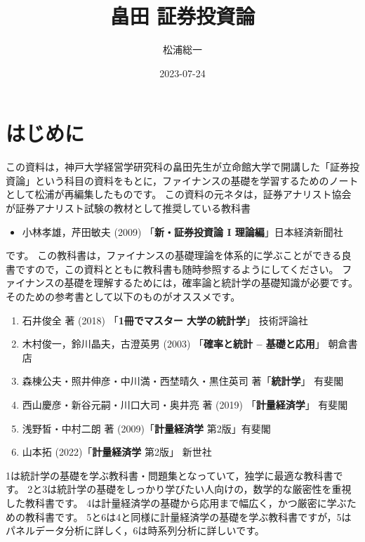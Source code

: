 \documentclass[
  letterpaper,
  pandoc,
  ja=standard,
  jafont = hiragino-pron]{ltjsbook}
\title{畠田 証券投資論}
\author{松浦総一}
\date{2023-07-24}
\providecommand{\tightlist}{%
  \setlength{\itemsep}{0pt}\setlength{\parskip}{0pt}}\usepackage{longtable,booktabs,array}
\renewcommand*\contentsname{Table of contents}
\newcommand\contentsname{Table of contents}
\begin{document}
\maketitle

\renewcommand*\contentsname{Table of contents}
{
\hypersetup{linkcolor=}
\setcounter{tocdepth}{1}
\tableofcontents
}


\chapter{はじめに}\label{ux306fux3058ux3081ux306b}

この資料は，神戸大学経営学研究科の畠田先生が立命館大学で開講した「証券投資論」という科目の資料をもとに，ファイナンスの基礎を学習するためのノートとして松浦が再編集したものです。
この資料の元ネタは，{証券アナリスト協会が証券アナリスト試験の教材として推奨している教科書}

\begin{itemize}
\tightlist
\item
  小林孝雄，芹田敏夫 (2009) 「\textbf{新・証券投資論 I
  理論編}」日本経済新聞社
\end{itemize}

です。
この教科書は，ファイナンスの基礎理論を体系的に学ぶことができる良書ですので，この資料とともに教科書も随時参照するようにしてください。
ファイナンスの基礎を理解するためには，確率論と統計学の基礎知識が必要です。そのための参考書として以下のものがオススメです。

\begin{enumerate}
\def\labelenumi{\arabic{enumi}.}
\tightlist
\item
  石井俊全 著 (2018) 「\textbf{1冊でマスター 大学の統計学}」 技術評論社
\item
  木村俊一，鈴川晶夫，古澄英男 (2003) 「\textbf{確率と統計 --
  基礎と応用}」 朝倉書店
\item
  森棟公夫・照井伸彦・中川満・西埜晴久・黒住英司 著「\textbf{統計学}」
  有斐閣
\item
  西山慶彦・新谷元嗣・川口大司・奥井亮 著 (2019) 「\textbf{計量経済学}」
  有斐閣
\item
  浅野皙・中村二朗 著 (2009)「\textbf{計量経済学} 第2版」有斐閣
\item
  山本拓 (2022)「\textbf{計量経済学} 第2版」 新世社
\end{enumerate}

1は統計学の基礎を学ぶ教科書・問題集となっていて，独学に最適な教科書です。
2と3は統計学の基礎をしっかり学びたい人向けの，数学的な厳密性を重視した教科書です。
4は計量経済学の基礎から応用まで幅広く，かつ厳密に学ぶための教科書です。
5と6は4と同様に計量経済学の基礎を学ぶ教科書ですが，5はパネルデータ分析に詳しく，6は時系列分析に詳しいです。
\end{document}
